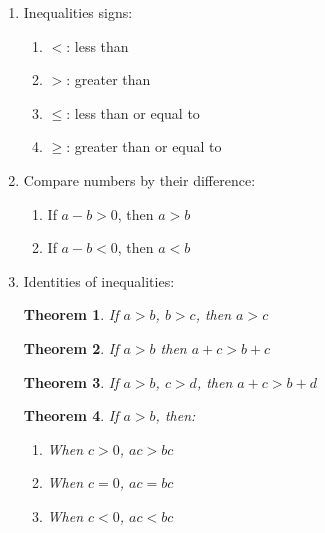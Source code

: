 \documentclass{report}
\newtheorem{theorem}{Theorem}
\begin{document}
\begin{multicols}{2}
    \begin{enumerate}
        \item Inequalities signs:
              \begin{enumerate}
                  \item $<$: less than
                  \item $>$: greater than
                  \item $\leq$: less than or equal to
                  \item $\geq$: greater than or equal to
              \end{enumerate}
        \item Compare numbers by their difference:
              \begin{enumerate}
                  \item If $a - b > 0$, then $a > b$
                  \item If $a - b < 0$, then $a < b$
              \end{enumerate}
        \item Identities of inequalities: \setcounter{theorem}{0}
              \begin{theorem}
                  If $a > b$, $b > c$, then $a > c$
              \end{theorem}
              \begin{theorem}
                  If $a > b$ then $a + c > b + c$
              \end{theorem}
              \begin{theorem}
                  If $a > b$, $c > d$, then $a + c > b + d$
              \end{theorem}
              \begin{theorem}
                  If $a > b$, then:
                  \begin{enumerate}
                      \item When $c > 0$, $ac > bc$
                      \item When $c = 0$, $ac = bc$
                      \item When $c < 0$, $ac < bc$
                  \end{enumerate}
              \end{theorem}
    \end{enumerate}
\end{multicols}
\end{document}
